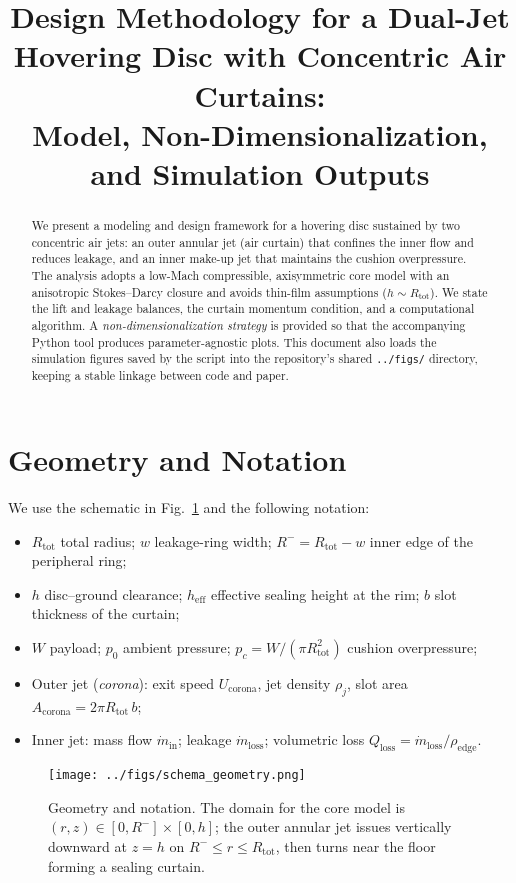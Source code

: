 \documentclass[11pt,a4paper]{article}
\title{Design Methodology for a Dual-Jet Hovering Disc with Concentric Air Curtains:\\
Model, Non-Dimensionalization, and Simulation Outputs}
\author{ }
\date{ }
\begin{document}
\maketitle

\begin{abstract}
We present a modeling and design framework for a hovering disc sustained by two concentric air jets: an outer annular jet (air curtain) that confines the inner flow and reduces leakage, and an inner make-up jet that maintains the cushion overpressure.
The analysis adopts a low-Mach compressible, axisymmetric core model with an anisotropic Stokes--Darcy closure and avoids thin-film assumptions ($h\sim R_{\mathrm{tot}}$). We state the lift and leakage balances, the curtain momentum condition, and a computational algorithm.
A \emph{non-dimensionalization strategy} is provided so that the accompanying Python tool produces parameter-agnostic plots. This document also loads the simulation figures saved by the script into the repository's shared \texttt{../figs/} directory, keeping a stable linkage between code and paper.
\end{abstract}

\section{Geometry and Notation}
We use the schematic in Fig.~\ref{fig:geometry} and the following notation:
\begin{itemize}
  \item $R_{\mathrm{tot}}$ total radius; $w$ leakage-ring width; $R^{-}=R_{\mathrm{tot}}-w$ inner edge of the peripheral ring;
  \item $h$ disc--ground clearance; $h_{\mathrm{eff}}$ effective sealing height at the rim; $b$ slot thickness of the curtain;
  \item $W$ payload; $p_0$ ambient pressure; $p_c=W/(\pi R_{\mathrm{tot}}^2)$ cushion overpressure;
  \item Outer jet (\emph{corona}): exit speed $U_{\mathrm{corona}}$, jet density $\rho_j$, slot area $A_{\mathrm{corona}}=2\pi R_{\mathrm{tot}}\,b$;
  \item Inner jet: mass flow $\dot m_{\mathrm{in}}$; leakage $\dot m_{\mathrm{loss}}$; volumetric loss $Q_{\mathrm{loss}}=\dot m_{\mathrm{loss}}/\rho_{\mathrm{edge}}$.
\end{itemize}

\begin{figure}[t]
  \centering
  \texttt{[image: ../figs/schema\_geometry.png]}
  \caption{Geometry and notation. The domain for the core model is $(r,z)\in[0,R^{-}]\times[0,h]$; the outer annular jet issues vertically downward at $z=h$ on $R^{-}\le r\le R_{\mathrm{tot}}$, then turns near the floor forming a sealing curtain.}
  \label{fig:geometry}
\end{figure}
\end{document}
